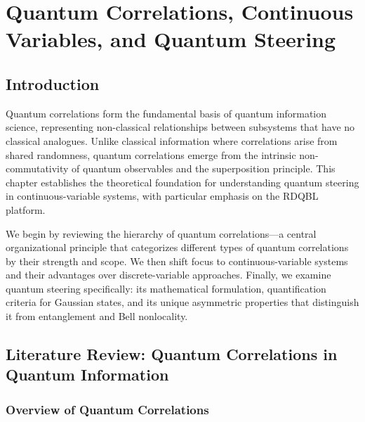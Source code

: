 
\chapter{Quantum Correlations, Continuous Variables, and Quantum Steering}
\label{chp2}
\newpage

\section{Introduction}

Quantum correlations form the fundamental basis of quantum information science, representing non-classical relationships between subsystems that have no classical analogues. Unlike classical information where correlations arise from shared randomness, quantum correlations emerge from the intrinsic non-commutativity of quantum observables and the superposition principle. This chapter establishes the theoretical foundation for understanding quantum steering in continuous-variable systems, with particular emphasis on the RDQBL platform.

We begin by reviewing the hierarchy of quantum correlations—a central organizational principle that categorizes different types of quantum correlations by their strength and scope. We then shift focus to continuous-variable systems and their advantages over discrete-variable approaches. Finally, we examine quantum steering specifically: its mathematical formulation, quantification criteria for Gaussian states, and its unique asymmetric properties that distinguish it from entanglement and Bell nonlocality.

\section{Literature Review: Quantum Correlations in Quantum Information}

\subsection{Overview of Quantum Correlations}

